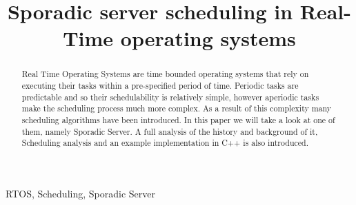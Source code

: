 \documentclass[conference]{IEEEtran}
\begin{document}
\title{Sporadic server scheduling in Real-Time operating systems\\
}

\author{
}

\maketitle

\begin{abstract}
Real Time Operating Systems are time bounded operating systems that rely on executing their tasks within a pre-specified period of time. Periodic tasks are predictable and so their schedulability is relatively simple, however aperiodic tasks make the scheduling process much more complex. As a result of this complexity many scheduling algorithms have been introduced. In this paper we will take a look at one of them, namely Sporadic Server. A full analysis of the history and background of it, Scheduling analysis and an example implementation in C++ is also introduced. 
\end{abstract}

\begin{IEEEkeywords}
RTOS, Scheduling, Sporadic Server
\end{IEEEkeywords}
\end{document}
